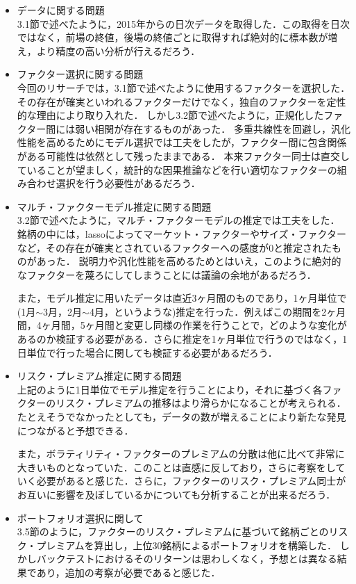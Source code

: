 ﻿\documentclass[11pt]{jreport}
\begin{document}
\begin{itemize}
\item{データに関する問題}\\
\quad 3.1節で述べたように，2015年からの日次データを取得した．この取得を日次ではなく，前場の終値，後場の終値ごとに取得すれば絶対的に標本数が増え，より精度の高い分析が行えるだろう．
\item{ファクター選択に関する問題}\\
\quad 今回のリサーチでは，3.1節で述べたように使用するファクターを選択した．
その存在が確実といわれるファクターだけでなく，独自のファクターを定性的な理由により取り入れた．
しかし3.2節で述べたように，正規化したファクター間には弱い相関が存在するものがあった．
多重共線性を回避し，汎化性能を高めるためにモデル選択では工夫をしたが，ファクター間に包含関係がある可能性は依然として残ったままである．
本来ファクター同士は直交していることが望ましく，統計的な因果推論などを行い適切なファクターの組み合わせ選択を行う必要性があるだろう．

\item{マルチ・ファクターモデル推定に関する問題}\\
\quad 3.2節で述べたように，マルチ・ファクターモデルの推定では工夫をした．
銘柄の中には，lassoによってマーケット・ファクターやサイズ・ファクターなど，その存在が確実とされているファクターへの感度が$0$と推定されたものがあった．
説明力や汎化性能を高めるためとはいえ，このように絶対的なファクターを蔑ろにしてしまうことには議論の余地があるだろう．

\quad また，モデル推定に用いたデータは直近3ヶ月間のものであり，1ヶ月単位で(1月$\sim$3月，2月$\sim$4月，というような)推定を行った．例えばこの期間を2ヶ月間，4ヶ月間，5ヶ月間と変更し同様の作業を行うことで，どのような変化があるのか検証する必要がある．さらに推定を1ヶ月単位で行うのではなく，1日単位で行った場合に関しても検証する必要があるだろう．
\item{リスク・プレミアム推定に関する問題}\\
\quad 上記のように1日単位でモデル推定を行うことにより，それに基づく各ファクターのリスク・プレミアムの推移はより滑らかになることが考えられる．
たとえそうでなかったとしても，データの数が増えることにより新たな発見につながると予想できる．

\quad また，ボラティリティ・ファクターのプレミアムの分散は他に比べて非常に大きいものとなっていた．このことは直感に反しており，さらに考察をしていく必要があると感じた．さらに，ファクターのリスク・プレミアム同士がお互いに影響を及ぼしているかについても分析することが出来るだろう．
\item{ポートフォリオ選択に関して}\\
\quad 3.5節のように，ファクターのリスク・プレミアムに基づいて銘柄ごとのリスク・プレミアムを算出し，上位30銘柄によるポートフォリオを構築した．
しかしバックテストにおけるそのリターンは思わしくなく，予想とは異なる結果であり，追加の考察が必要であると感じた．

\end{itemize}
\end{document}
